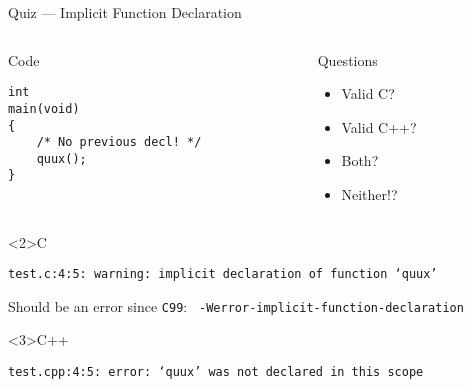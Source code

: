 \documentclass[presentation,aspectratio=169]{beamer}
\begin{document}
\begin{frame}[fragile,label={sec:org23c4234}]{Quiz — Implicit Function Declaration}
\begin{columns}
\begin{column}{0.48\columnwidth}
\begin{block}{Code}
\begin{verbatim}
int
main(void)
{
    /* No previous decl! */
    quux();
}
\end{verbatim}
\end{block}
\end{column}

\begin{column}{0.48\columnwidth}
\begin{block}{Questions}
\begin{itemize}
\item Valid C?
\item Valid C++?
\item Both?
\item Neither!?
\end{itemize}
\end{block}
\end{column}
\end{columns}

\begin{block}<2>{C}
\begin{verbatim}
test.c:4:5: warning: implicit declaration of function ‘quux’
\end{verbatim}
Should be an error since \texttt{C99}: \texttt{ -Werror-implicit-function-declaration}
\end{block}

\vspace{-2cm}
\begin{block}<3>{C++}
\begin{verbatim}
test.cpp:4:5: error: ‘quux’ was not declared in this scope
\end{verbatim}
\end{block}
\end{frame}

\end{document}
